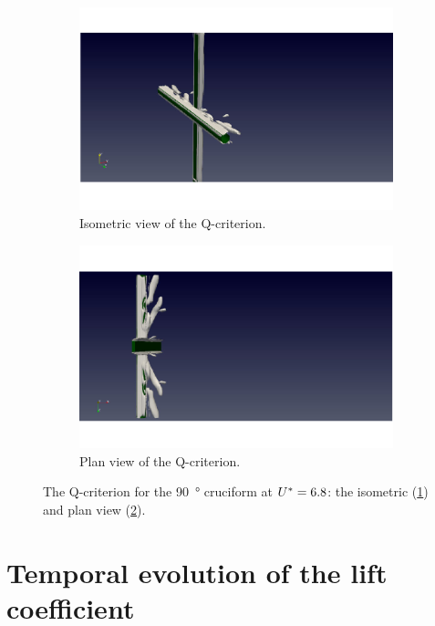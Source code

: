 \documentclass[oneside]{utmthesis}
\begin{document}
\begin{figure}
  \centering
  \begin{subfigure}[h]{0.9\textwidth}
    \includegraphics[width=\textwidth]{figs/qIso090U02}
    \caption{Isometric view of the Q-criterion.}
    \label{fig:qIso090U02}
  \end{subfigure}
  
  \begin{subfigure}[h]{0.9\textwidth}
    \includegraphics[width=\textwidth]{figs/qTop090U02}
    \caption{Plan view of the Q-criterion.}
    \label{fig:qTop090U02}
  \end{subfigure}

  \caption{The Q-criterion for the \SI{90}{\degree} cruciform at $U^{*} = 6.8$: the isometric (\ref{fig:qIso090U02}) and plan view (\ref{fig:qTop090U02}).} \label{fig:qCrit090U02}
\end{figure}

\section{Temporal evolution of the lift coefficient} \label{sec:tempEvo}
\end{document}
